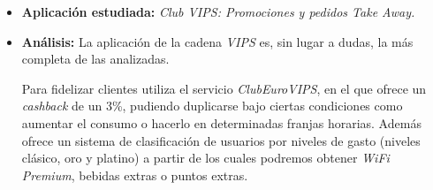 \documentclass[twoside]{report}
\begin{document}
\begin{itemize}
\item \textbf{Aplicación estudiada:} \cite{vipsapp} \textit{Club VIPS: Promociones y pedidos Take Away.}
\item \textbf{Análisis:} 
La aplicación de la cadena \textit{VIPS} es, sin lugar a dudas, la más completa de las analizadas.

Para fidelizar clientes utiliza el servicio \textit{ClubEuroVIPS}, en el que ofrece un \textit{cashback} de un 3\%, pudiendo duplicarse bajo ciertas condiciones como aumentar el consumo o hacerlo en determinadas franjas horarias. Además ofrece un sistema de clasificación de usuarios por niveles de gasto (niveles clásico, oro y platino) a partir de los cuales podremos obtener \textit{WiFi Premium}, bebidas extras o puntos extras.


\end{itemize}
\end{document}
